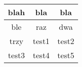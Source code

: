 \documentclass{article}
\begin{document}
\begin{tabular}{|c|c|c|}\hline
blah & bla & bla\\
\hline
ble
 & raz & dwa\\
\hline
trzy
 & test1 & test2\\
\hline
test3 & test4 & test5
\\
\hline
\end{tabular}
\end{document}
